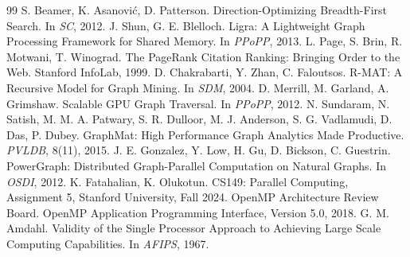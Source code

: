 \documentclass[11pt,a4paper]{ctexart}
\begin{document}
\begin{thebibliography}{99}
 S. Beamer, K. Asanovi\'c, D. Patterson. Direction-Optimizing Breadth-First Search. In \emph{SC}, 2012.
 J. Shun, G. E. Blelloch. Ligra: A Lightweight Graph Processing Framework for Shared Memory. In \emph{PPoPP}, 2013.
 L. Page, S. Brin, R. Motwani, T. Winograd. The PageRank Citation Ranking: Bringing Order to the Web. Stanford InfoLab, 1999.
 D. Chakrabarti, Y. Zhan, C. Faloutsos. R-MAT: A Recursive Model for Graph Mining. In \emph{SDM}, 2004.
 D. Merrill, M. Garland, A. Grimshaw. Scalable GPU Graph Traversal. In \emph{PPoPP}, 2012.
 N. Sundaram, N. Satish, M. M. A. Patwary, S. R. Dulloor, M. J. Anderson, S. G. Vadlamudi, D. Das, P. Dubey. GraphMat: High Performance Graph Analytics Made Productive. \emph{PVLDB}, 8(11), 2015.
 J. E. Gonzalez, Y. Low, H. Gu, D. Bickson, C. Guestrin. PowerGraph: Distributed Graph-Parallel Computation on Natural Graphs. In \emph{OSDI}, 2012.
 K. Fatahalian, K. Olukotun. CS149: Parallel Computing, Assignment 5, Stanford University, Fall 2024.
 OpenMP Architecture Review Board. OpenMP Application Programming Interface, Version 5.0, 2018.
 G. M. Amdahl. Validity of the Single Processor Approach to Achieving Large Scale Computing Capabilities. In \emph{AFIPS}, 1967.
\end{thebibliography}
\end{document}

